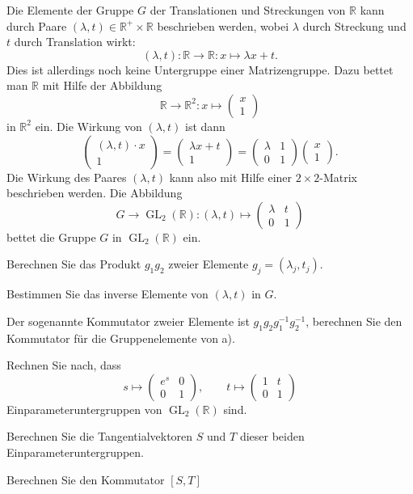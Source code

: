 Die Elemente der Gruppe $G$ der Translationen und Streckungen von
$\mathbb{R}$ kann durch Paare $(\lambda,t)\in\mathbb{R}^+\times\mathbb{R}$
beschrieben werden,
wobei $\lambda$ durch Streckung und $t$ durch Translation wirkt:
\[
(\lambda,t)\colon \mathbb{R}\to\mathbb{R}: x\mapsto \lambda x+t.
\]
Dies ist allerdings noch keine Untergruppe einer Matrizengruppe.
Dazu bettet man $\mathbb{R}$ mit Hilfe der Abbildung
\[
\mathbb{R}\to\mathbb{R}^2 : x\mapsto \begin{pmatrix}x\\1\end{pmatrix}
\]
in $\mathbb{R}^2$ ein.
Die Wirkung von $(\lambda,t)$ ist dann
\[
\begin{pmatrix}(\lambda,t)\cdot x\\1\end{pmatrix}
=
\begin{pmatrix} \lambda x + t\\1\end{pmatrix}
=
\begin{pmatrix}\lambda&1\\0&1\end{pmatrix}\begin{pmatrix}x\\1\end{pmatrix}.
\]
Die Wirkung des Paares $(\lambda,t)$ kann also mit Hilfe einer 
$2\times 2$-Matrix beschrieben werden.
Die Abbildung
\[
G\to \operatorname{GL}_2(\mathbb{R})
:
(\lambda,t)
\mapsto
\begin{pmatrix}\lambda&t\\0&1\end{pmatrix}
\]
bettet die Gruppe $G$ in $\operatorname{GL}_2(\mathbb{R})$ ein.
\begin{teilaufgaben}
\item
Berechnen Sie das Produkt $g_1g_2$ zweier Elemente
$g_j=(\lambda_j,t_j)$.
\item 
Bestimmen Sie das inverse Elemente von $(\lambda,t)$ in $G$.
\item
Der sogenannte Kommutator zweier Elemente ist $g_1g_2g_1^{-1}g_2^{-1}$,
berechnen Sie den Kommutator für die Gruppenelemente von a).
\item
Rechnen Sie nach, dass
\[
s\mapsto \begin{pmatrix}e^s&0\\0&1\end{pmatrix}
,\qquad
t\mapsto \begin{pmatrix}1&t\\0&1\end{pmatrix}
\]
Einparameteruntergruppen von $\operatorname{GL}_2(\mathbb{R})$ sind.
\item
Berechnen Sie die Tangentialvektoren $S$ und $T$ dieser beiden
Einparameteruntergruppen.
\item
Berechnen Sie den Kommutator $[S,T]$
\end{teilaufgaben}

